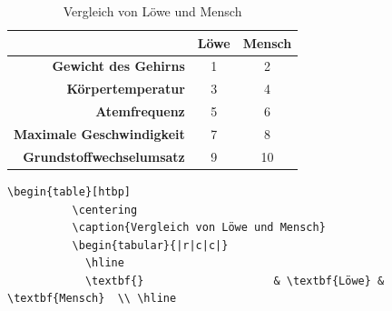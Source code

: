 \documentclass["WS\space 16-17\space -\space LaTeX-Kurs\space -\space Praesentation\space -\space 2.tex"]{subfiles}
\begin{document}
\begin{frame}[fragile]
    \vspace{-0.2cm}
    \Losung
    \vspace{-0.1cm}
	\begin{outputbox}
        \vspace{-0.4cm}
		\begin{center}
            \begin{table}[htbp] 
                \centering
                \caption{Vergleich von Löwe und Mensch}
                \vspace{-0.4cm}
                \begin{tabular}{|r|c|c|}
                    \hline 
                    \textbf{}                         & \textbf{Löwe} & \textbf{Mensch}  \\ \hline 
                    \textbf{Gewicht des Gehirns}      & 1             & 2                \\ \hline 
                    \textbf{Körpertemperatur}         & 3             & 4                \\ \hline 
                    \textbf{Atemfrequenz}             & 5             & 6                \\ \hline 
                    \textbf{Maximale Geschwindigkeit} & 7             & 8                \\ \hline 
                    \textbf{Grundstoffwechselumsatz}  & 9             & 10               \\ \hline
                \end{tabular} 
                \label{}
            \end{table}
		\end{center}
        \vspace{-0.4cm}
	\end{outputbox}
    \vspace{-0.2cm}
    \Code
    \vspace{-0.1cm}
	\begin{lstlisting}[gobble=8]
        \begin{table}[htbp]
          \centering
          \caption{Vergleich von Löwe und Mensch}
          \begin{tabular}{|r|c|c|}
            \hline 
            \textbf{}                    & \textbf{Löwe} & \textbf{Mensch}  \\ \hline 

\end{lstlisting}
\end{frame}
\end{document}
